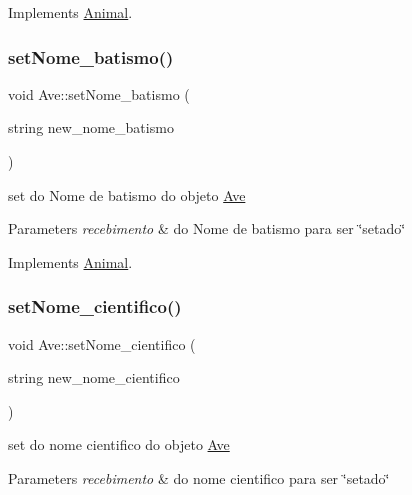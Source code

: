Implements \mbox{\hyperlink{class_animal}{Animal}}.

\mbox{\label{class_ave_a9a225399e1e119e4ad4ba38fa06976d2}} 
\subsubsection{\texorpdfstring{setNome\_batismo()}{setNome\_batismo()}}
{\footnotesize\ttfamily void Ave\+::set\+Nome\+\_\+batismo (\begin{DoxyParamCaption}\item[{string}]{new\+\_\+nome\+\_\+batismo }\end{DoxyParamCaption})\hspace{0.3cm}{\ttfamily [virtual]}}



set do Nome de batismo do objeto \mbox{\hyperlink{class_ave}{Ave}} 


\begin{DoxyParams}{Parameters}
{\em recebimento} & do Nome de batismo para ser \char`\"{}setado\char`\"{} \\
\hline
\end{DoxyParams}


Implements \mbox{\hyperlink{class_animal}{Animal}}.

\mbox{\label{class_ave_a60b4ceef85ecc436ef63b6297e779909}} 
\subsubsection{\texorpdfstring{setNome\_cientifico()}{setNome\_cientifico()}}
{\footnotesize\ttfamily void Ave\+::set\+Nome\+\_\+cientifico (\begin{DoxyParamCaption}\item[{string}]{new\+\_\+nome\+\_\+cientifico }\end{DoxyParamCaption})\hspace{0.3cm}{\ttfamily [virtual]}}



set do nome cientifico do objeto \mbox{\hyperlink{class_ave}{Ave}} 


\begin{DoxyParams}{Parameters}
{\em recebimento} & do nome cientifico para ser \char`\"{}setado\char`\"{} \\
\hline
\end{DoxyParams}


